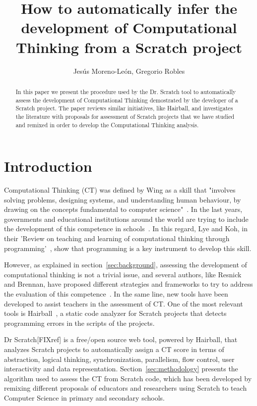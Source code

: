 \documentclass[a4paper,11pt]{article}
\title{How to automatically infer the development of Computational Thinking from a Scratch project}
\author{Jesús Moreno-León, Gregorio Robles}
\begin{document}
\maketitle

\begin{abstract}
In this paper we present the procedure used by the Dr. Scratch tool to automatically assess the development of Computational Thinking  demostrated by the developer of a Scratch project. The paper reviews similar initiatives, like Hairball, and investigates the literature with proposals for assessment of Scratch projects that we have studied and remixed in order to develop the Computational Thinking analysis.

\end{abstract}

\section{Introduction}
Computational Thinking (CT) was defined by Wing as a skill that "involves solving problems, designing systems, and understanding human behaviour, by drawing on the concepts fundamental to computer science"~\cite{wing2006computational}. In the last years, governments and educational institutions around the world are trying to include the development of this competence in schools~\cite{euschoolnet}. In this regard, Lye and Koh, in their 'Review on teaching and learning of computational thinking through programming'~\cite{lye2014review}, show that programming is a key instrument to develop this skill.

However, as explained in section~\ref{sec:background}, assessing the development of computational thinking is not a trivial issue, and several authors, like Resnick and Brennan, have proposed different strategies and frameworks to try to address the evaluation of this competence~\cite{brennan2012new}. In the same line, new tools have been developed to assist teachers in the assessment of CT. One of the most relevant tools is Hairball~\cite{boe2013hairball}, a static code analyzer for Scratch projects that detects programming errors in the scripts of the projects.

Dr Scratch[FIXref] is a free/open source web tool, powered by Hairball, that analyzes Scratch projects to automatically assign a CT score in terms of abstraction, logical thinking, synchronization, parallelism, flow control, user interactivity and data representation. Section~\ref{sec:methodology} presents the algorithm used to assess the CT from Scratch code, which has been developed by remixing different proposals of educators and researchers using Scratch to teach Computer Science in primary and secondary schools.
\end{document}
